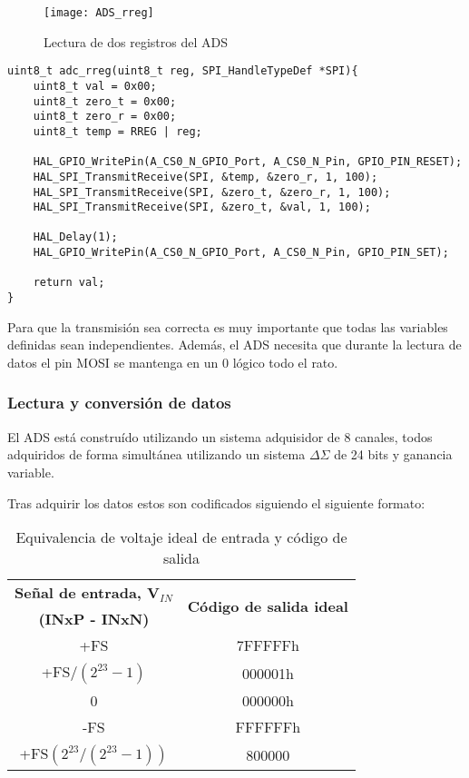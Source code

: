 \begin{figure} [h]
    \centering
    \texttt{[image: ADS\_rreg]}
    \caption{Lectura de dos registros del ADS \cite{Datasheet_ADS}}
    \label{fig:ADS_rreg}
\end{figure}

\begin{lstlisting}[label=algoritmo:STM_rreg,style = STM-code,frame=single,caption=Lectura de registros del ADS]
uint8_t adc_rreg(uint8_t reg, SPI_HandleTypeDef *SPI){
	uint8_t val = 0x00;
	uint8_t zero_t = 0x00;
	uint8_t zero_r = 0x00;
	uint8_t temp = RREG | reg;
	
	HAL_GPIO_WritePin(A_CS0_N_GPIO_Port, A_CS0_N_Pin, GPIO_PIN_RESET);
	HAL_SPI_TransmitReceive(SPI, &temp, &zero_r, 1, 100);
	HAL_SPI_TransmitReceive(SPI, &zero_t, &zero_r, 1, 100);	
	HAL_SPI_TransmitReceive(SPI, &zero_t, &val, 1, 100);

	HAL_Delay(1);
	HAL_GPIO_WritePin(A_CS0_N_GPIO_Port, A_CS0_N_Pin, GPIO_PIN_SET);

	return val;
}
\end{lstlisting}

Para que la transmisión sea correcta es muy importante que todas las variables definidas sean independientes. Además, el ADS necesita que durante la lectura de datos el pin \textsc{MOSI} se mantenga en un 0 lógico todo el rato.

\subsubsection{Lectura y conversión de datos \label{sec:Software_micro_Datos}}

El ADS está construído utilizando un sistema adquisidor de 8 canales, todos adquiridos de forma simultánea utilizando un sistema $\Delta\Sigma$ de 24 bits y ganancia variable.

Tras adquirir los datos estos son codificados siguiendo el siguiente formato:
\begin{table} [H]
 \centering
 \begin{tabular}{|c|c|}
 \hline 
\textbf{Señal de entrada, V$_{IN}$} &  \multirow{2}{*}{\textbf{Código de salida ideal}}\\ 
 \textbf{(INxP - INxN)} &  \\ 
 \hline 
 +FS & 7FFFFFh\\ 
 \hline 
 +FS$/(2^{23}-1)$ & 000001h \\ 
 \hline 
 0 & 000000h\\ 
 \hline 
 -FS & FFFFFFh\\ 
 \hline 
 +FS$(2^{23}/(2^{23}-1))$ & 800000 \\ 
 \hline 
 \end{tabular} 
 \caption{Equivalencia de voltaje ideal de entrada y código de salida}
 \label{tab:ADS_equivalencia}
\end{table}


